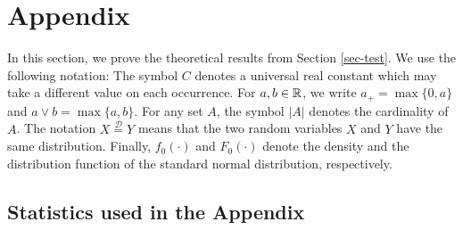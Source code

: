 \documentclass[a4paper,12pt]{article}
\begin{document}
\newpage

\section{Appendix}\label{sec-appendix}
In this section, we prove the theoretical results from Section \ref{sec-test}. We use the following notation: The symbol $C$ denotes a universal real constant which may take a different value on each occurrence. For $a,b \in \mathbb{R}$, we write $a_+ = \max \{0,a\}$ and $a \vee b = \max\{a,b\}$. For any set $A$, the symbol $|A|$ denotes the cardinality of $A$. The notation $X \stackrel{\mathcal{D}}{=} Y$ means that the two random variables $X$ and $Y$ have the same distribution. Finally, $f_0(\cdot)$ and $F_0(\cdot)$ denote the density and the distribution function of the standard normal distribution, respectively.

\subsection{Statistics used in the Appendix}\label{subsec-appendix-stats}
\end{document}
